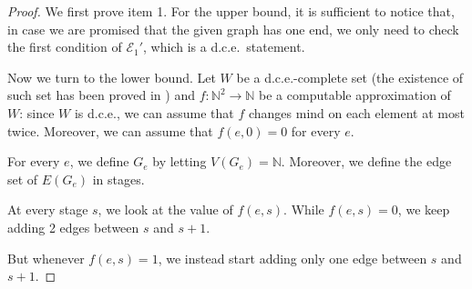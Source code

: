 \documentclass[10pt,A4]{amsart}
\theoremstyle{definition}
\theoremstyle{definition}
\newcommand{\eulerone}{\mathscr{E} _{1}}
\newcommand{\N}{\mathbb{N}}
\begin{document}
\begin{proof}
    We first prove item 1. For the upper bound, it is sufficient to notice that, in case we are promised that the given graph has one end, we only need to check the first condition of $\eulerone'$, which is a d.c.e.~statement.
    
    Now we turn to the lower bound. Let $W$ be a d.c.e.-complete set (the existence of such set has been proved in \cite{Ershov}) and $f: \N^2 \to \N$ be a computable approximation of $W$: since $W$ is d.c.e., we can assume that $f$ changes mind on each element at most twice. Moreover, we can assume that $f(e,0)=0$ for every $e$. 

For every $e$, we define $G_e$ by letting $V(G_e) = \N$. Moreover, we define the edge set of $E(G_e)$ in stages. 
    
    At every stage $s$, we look at the value of $f(e,s)$. While $f(e,s)=0$, we keep adding 2 edges between $s$ and $s+1$. 
    
            \begin{tcolorbox}
        \begin{center}
        \end{center}
    \end{tcolorbox}
    
    But whenever $f(e,s)=1$, we instead start adding only one edge between $s$ and $s+1$. 
    

\end{proof}
\end{document}
